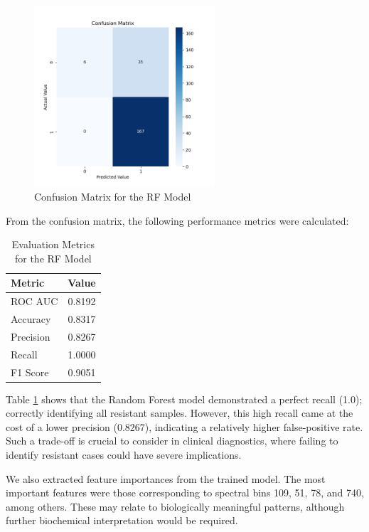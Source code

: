 \documentclass{article}
\begin{document}
\begin{figure}[h]
  \centering
  \includegraphics[width=0.6\textwidth]{confusion_matrix_Random_Forest.png}
  \caption{Confusion Matrix for the RF Model}
  \label{fig:rf_confusion_matrix}
\end{figure}

From the confusion matrix, the following performance metrics were calculated:

\begin{table}[h]
\centering
\caption{Evaluation Metrics for the RF Model}
\label{tab:Random Forest Performance Metrics}
\begin{tabular}{|l|c|}
\hline
\textbf{Metric} & \textbf{Value} \\
\hline
ROC AUC   & 0.8192 \\
Accuracy  & 0.8317 \\
Precision & 0.8267 \\
Recall    & 1.0000 \\
F1 Score  & 0.9051 \\
\bottomrule
\end{tabular}
\end{table}

Table \ref{tab:Random Forest Performance Metrics} shows that the Random Forest model demonstrated a perfect recall (1.0); correctly identifying all resistant samples. However, this high recall came at the cost of a lower precision (0.8267), indicating a relatively higher false-positive rate. Such a trade-off is crucial to consider in clinical diagnostics, where failing to identify resistant cases could have severe implications.

We also extracted feature importances from the trained model. The most important features were those corresponding to spectral bins 109, 51, 78, and 740, among others. These may relate to biologically meaningful patterns, although further biochemical interpretation would be required.
\end{document}
